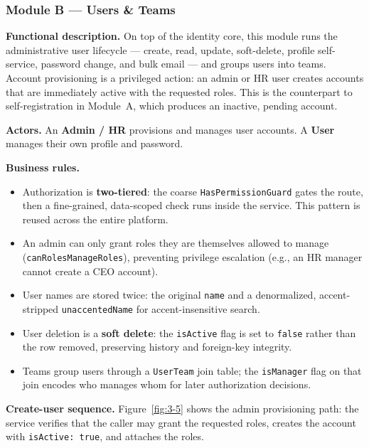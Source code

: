 
\subsubsection{Module B --- Users \& Teams}

\textbf{Functional description.} On top of the identity core, this module runs the
administrative user lifecycle --- create, read, update, soft-delete, profile self-service,
password change, and bulk email --- and groups users into teams. Account provisioning is a
privileged action: an admin or HR user creates accounts that are immediately active with the
requested roles. This is the counterpart to self-registration in Module~A, which produces an
inactive, pending account.

\textbf{Actors.} An \textbf{Admin / HR} provisions and manages user accounts. A \textbf{User}
manages their own profile and password.

\textbf{Business rules.}
\begin{itemize}
  \item Authorization is \textbf{two-tiered}: the coarse \texttt{HasPermissionGuard} gates the
    route, then a fine-grained, data-scoped check runs inside the service. This pattern is
    reused across the entire platform.
  \item An admin can only grant roles they are themselves allowed to manage
    (\texttt{canRolesManageRoles}), preventing privilege escalation (e.g., an HR manager cannot
    create a CEO account).
  \item User names are stored twice: the original \texttt{name} and a denormalized,
    accent-stripped \texttt{unaccentedName} for accent-insensitive search.
  \item User deletion is a \textbf{soft delete}: the \texttt{isActive} flag is set to
    \texttt{false} rather than the row removed, preserving history and foreign-key integrity.
  \item Teams group users through a \texttt{UserTeam} join table; the \texttt{isManager} flag on
    that join encodes who manages whom for later authorization decisions.
\end{itemize}

\textbf{Create-user sequence.} Figure~\ref{fig:3-5} shows the admin provisioning path: the
service verifies that the caller may grant the requested roles, creates the account with
\texttt{isActive: true}, and attaches the roles.

